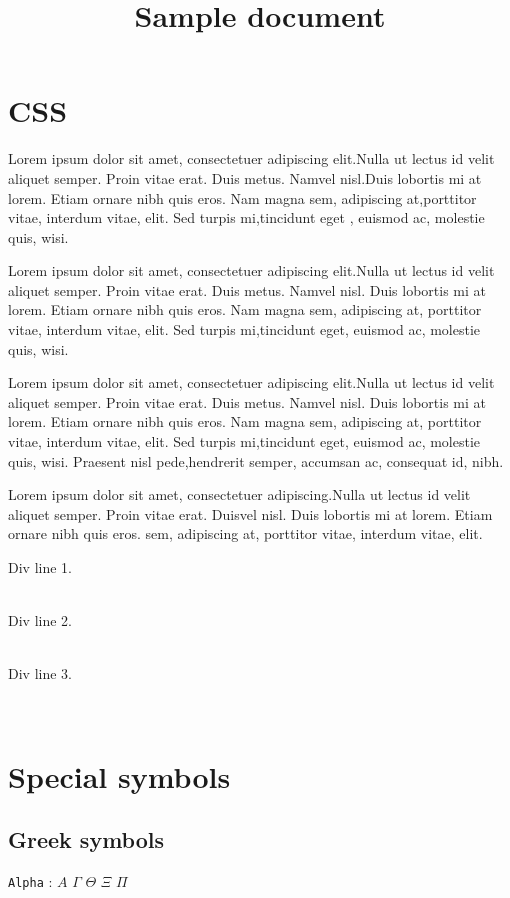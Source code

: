 \documentclass{report}
\title{Sample document}
\newcommand{\Alpha}{A}
\begin{document}
\maketitle
 \section*{CSS} \par Lorem ipsum dolor sit amet, consectetuer adipiscing elit.Nulla ut lectus id velit aliquet semper. Proin vitae erat. Duis metus. Namvel nisl.Duis lobortis mi at lorem. Etiam ornare nibh quis eros. Nam magna sem, adipiscing at,porttitor vitae, interdum vitae, elit. Sed turpis mi,tincidunt eget , euismod ac, molestie quis, wisi.
\par Lorem ipsum dolor sit amet, consectetuer adipiscing elit.Nulla ut lectus id velit aliquet semper. Proin vitae erat. Duis metus. Namvel nisl. Duis lobortis mi at lorem. Etiam ornare nibh quis eros. Nam magna sem, adipiscing at, porttitor vitae, interdum vitae, elit. Sed turpis mi,tincidunt eget, euismod ac, molestie quis, wisi.
\par Lorem ipsum dolor sit amet, consectetuer adipiscing elit.Nulla ut lectus id velit aliquet semper. Proin vitae erat. Duis metus. Namvel nisl. Duis lobortis mi at lorem. Etiam ornare nibh quis eros. Nam magna sem, adipiscing at, porttitor vitae, interdum vitae, elit. Sed turpis mi,tincidunt eget, euismod ac, molestie quis, wisi. Praesent nisl pede,hendrerit semper, accumsan ac, consequat id, nibh.
\par Lorem ipsum dolor sit amet, consectetuer adipiscing.Nulla ut lectus id velit aliquet semper. Proin vitae erat. Duisvel nisl. Duis lobortis mi at lorem. Etiam ornare nibh quis eros. sem, adipiscing at, porttitor vitae, interdum vitae, elit.
 \\ \par Div line 1. 
 \\ 
 \\ \par Div line 2. 
 \\ 
 \\ \par Div line 3.
 \\ 
 \\ 
  \section*{Special symbols}  \subsection*{Greek symbols} \par  \texttt{Alpha}
: $\Alpha$ $\Gamma$ $\Theta$ $\Xi$ $\Pi$ 
\end{document}
